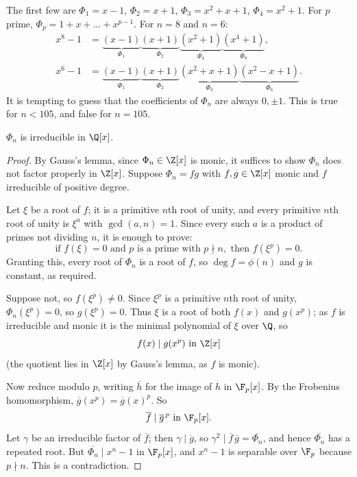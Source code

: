 \begin{example}
	The first few are $\Phi_1 = x-1$, $\Phi_2 = x+1$, $\Phi_3 = x^2+x+1$, $\Phi_4 = x^2+1$. For $p$ prime, $\Phi_p = 1 + x + \dots + x^{p-1}$. For $n = 8$ and $n=6$:
	\begin{align*}
		x^8-1 &= \underbrace{(x-1)}_{\Phi_1}\underbrace{(x+1)}_{\Phi_2}\underbrace{(x^2+1)}_{\Phi_4}\underbrace{(x^4+1)}_{\Phi_8},\\
		x^6-1 &= \underbrace{(x-1)}_{\Phi_1}\underbrace{(x+1)}_{\Phi_2}\underbrace{(x^2+x+1)}_{\Phi_3}\underbrace{(x^2-x+1)}_{\Phi_6}.
	\end{align*}
	It is tempting to guess that the coefficients of $\Phi_n$ are always $0, \pm1$. This is true for $n < 105$, and false for $n = 105$.
\end{example}

\begin{theorem}\label{thm:phiirred}
	$\Phi_n$ is irreducible in $\Q[x]$.
\end{theorem}

\begin{proof}
	By Gauss's lemma, since $\Phi_n \in \Z[x]$ is monic, it suffices to show $\Phi_n$ does not factor properly in $\Z[x]$. Suppose $\Phi_n = fg$ with $f, g \in \Z[x]$ monic and $f$ irreducible of positive degree.

	Let $\xi$ be a root of $f$; it is a primitive $n$th root of unity, and every primitive $n$th root of unity is $\xi^a$ with $\gcd(a,n)=1$. Since every such $a$ is a product of primes not dividing $n$, it is enough to prove:
	$$\text{if } f(\xi) = 0 \text{ and } p \text{ is a prime with } p \nmid n, \text{ then } f(\xi^p) = 0.$$
	Granting this, every root of $\Phi_n$ is a root of $f$, so $\deg f = \phi(n)$ and $g$ is constant, as required.

	Suppose not, so $f(\xi^p) \neq 0$. Since $\xi^p$ is a primitive $n$th root of unity, $\Phi_n(\xi^p) = 0$, so $g(\xi^p) = 0$. Thus $\xi$ is a root of both $f(x)$ and $g(x^p)$; as $f$ is irreducible and monic it is the minimal polynomial of $\xi$ over $\Q$, so
	$$f(x) \mid g(x^p) \text{ in } \Z[x]$$
	(the quotient lies in $\Z[x]$ by Gauss's lemma, as $f$ is monic).

	Now reduce modulo $p$, writing $\overline h$ for the image of $h$ in $\F_p[x]$. By the Frobenius homomorphism, $\overline g(x^p) = \overline g(x)^p$. So
	$$\overline f \mid \overline g^{\,p} \text{ in } \F_p[x].$$
	Let $\gamma$ be an irreducible factor of $\overline f$; then $\gamma \mid \overline g$, so $\gamma^2 \mid \overline f\, \overline g = \overline{\Phi_n}$, and hence $\overline{\Phi_n}$ has a repeated root. But $\overline{\Phi_n} \mid x^n-1$ in $\F_p[x]$, and $x^n-1$ is separable over $\F_p$ because $p \nmid n$. This is a contradiction.
\end{proof}

